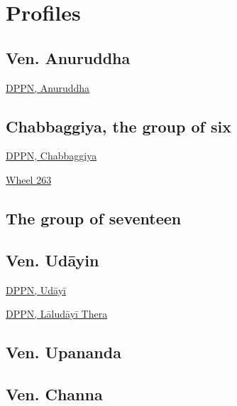 \chapter{Profiles}

\section{Ven. Anuruddha}

\href{https://what-buddha-said.net/library/DPPN/ay/anuruddha.htm}{DPPN,
Anuruddha}

\section{Chabbaggiya, the group of six}

\href{https://what-buddha-said.net/library/DPPN/c/chabbaggiyaa.htm}{DPPN,
Chabbaggiya}

\href{https://what-buddha-said.net/library/ati_website/html/lib/authors/hecker/wheel263.html}{Wheel
263}

\section{The group of seventeen}

\section{Ven. Udāyin}

\href{https://what-buddha-said.net/library/DPPN/u/udaayii.htm}{DPPN,
Udāyī}

\href{https://what-buddha-said.net/library/DPPN/l/laludayi_th.htm}{DPPN,
Lāludāyī Thera}

\section{Ven. Upananda}

\section{Ven. Channa}

